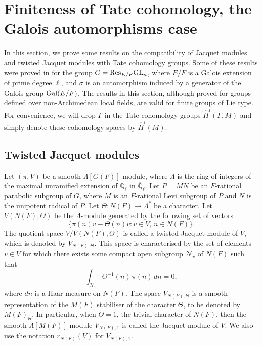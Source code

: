 \documentclass[10pt, reqno]{amsart}
\theoremstyle{plain}
\numberwithin{equation}{section} \newcommand{\di}{\operatorname{dim}}
\begin{document}
\section{Finiteness of Tate cohomology, the Galois automorphisms
  case}\label{sec_jac_mod}
In this section, we prove some results on the compatibility of Jacquet
modules and twisted Jacquet modules with Tate cohomology groups. Some of 
these results were proved in \cite[Section 6]
{nadimpalli2024tate} for the group $G={\rm Res}_{E/F}{\rm GL}_n$,
where $E/F$ is a Galois extension of prime degree $\ell$, and $\sigma$
is an automorphism induced by a generator of the Galois group
${\rm Gal}(E/F)$. The results in this section, although
proved for groups defined over non-Archimedean local fields,
are valid for finite
groups of Lie type. For convenience, we will drop $\Gamma$ in the Tate cohomology
groups $\widehat{H}^i(\Gamma, M)$ and simply denote these cohomology spaces by
$\widehat{H}^i(M)$. 
\subsection{Twisted Jacquet modules}
Let $(\pi,V)$ be a smooth $\Lambda[G(F)]$ module, where $\Lambda$ is
the ring of integers of the maximal unramified extension of
$\mathbb{Q}_\ell$ in $\overline{\mathbb{Q}}_\ell$.  Let $P=MN$ be an
$F$-rational parabolic subgroup of $G$, where $M$ is an $F$-rational
Levi subgroup of $P$ and 
$N$ is the unipotent radical of $P$. Let
$\Theta:N(F)\rightarrow \Lambda^\ast$ be a character. Let
$V(N(F),\Theta)$ be the $\Lambda$-module generated by the following
set of vectors
$$ \big\{\pi(n)v-\Theta(n)v:v\in V,\,
n\in N(F)\big\}. $$ The quotient space $V/V(N(F),\Theta)$ is called a
twisted Jacquet module of $V$, which is denoted by $V_{N(F),\Theta}$.
This space is characterised by the set of elements $v\in V$ for which
there exists some compact open subgroup $\mathcal{N}_v$ of  $N(F)$ such
that
$$ \int_{\mathcal{N}_v} \Theta^{-1}(n)\,
\pi(n)\,dn = 0, $$ where $dn$ is a Haar measure on $N(F)$.  
The space $V_{N(F),\Theta}$ is a smooth
representation of the $M(F)$ stabiliser of 
the character $\Theta$, to be denoted by $M(F)_\Theta$.  In particular,
when $\Theta=1$, the trivial character of $N(F)$, then the smooth
$\Lambda[M(F)]$ module $V_{N(F),1}$ is called the Jacquet module of
$V$. We also use the notation $r_{N(F)}(V)$ for $V_{N(F),1}$.
\end{document}
